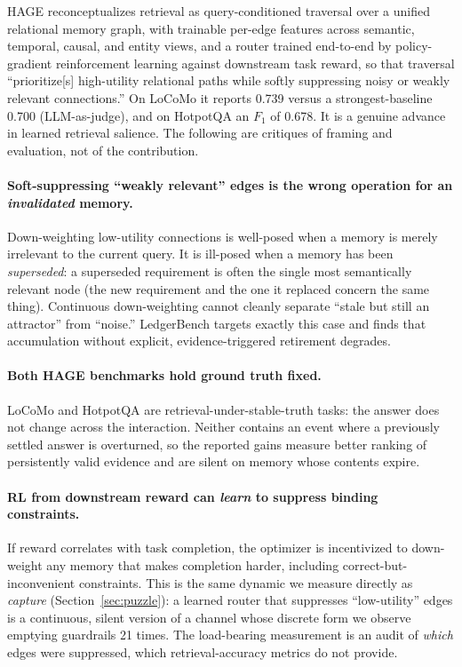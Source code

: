 \documentclass[11pt]{article}
\begin{document}
HAGE reconceptualizes retrieval as query-conditioned traversal over a unified
relational memory graph, with trainable per-edge features across semantic,
temporal, causal, and entity views, and a router trained end-to-end by
policy-gradient reinforcement learning against downstream task reward, so
that traversal ``prioritize[s] high-utility relational paths while softly
suppressing noisy or weakly relevant connections.'' On LoCoMo it reports
0.739 versus a strongest-baseline 0.700 (LLM-as-judge), and on HotpotQA an
$F_1$ of 0.678. It is a genuine advance in learned retrieval salience. The
following are critiques of framing and evaluation, not of the contribution.

\paragraph{Soft-suppressing ``weakly relevant'' edges is the wrong operation
for an \emph{invalidated} memory.} Down-weighting low-utility connections is
well-posed when a memory is merely irrelevant to the current query. It is
ill-posed when a memory has been \emph{superseded}: a superseded requirement
is often the single most semantically relevant node (the new requirement and
the one it replaced concern the same thing). Continuous down-weighting cannot
cleanly separate ``stale but still an attractor'' from ``noise.'' LedgerBench
targets exactly this case and finds that accumulation without explicit,
evidence-triggered retirement degrades.

\paragraph{Both HAGE benchmarks hold ground truth fixed.} LoCoMo and
HotpotQA are retrieval-under-stable-truth tasks: the answer does not change
across the interaction. Neither contains an event where a previously settled
answer is overturned, so the reported gains measure better ranking of
persistently valid evidence and are silent on memory whose contents expire.

\paragraph{RL from downstream reward can \emph{learn} to suppress binding
constraints.} If reward correlates with task completion, the optimizer is
incentivized to down-weight any memory that makes completion harder,
including correct-but-inconvenient constraints. This is the same dynamic we
measure directly as \emph{capture} (Section~\ref{sec:puzzle}): a learned
router that suppresses ``low-utility'' edges is a continuous, silent version
of a channel whose discrete form we observe emptying guardrails 21 times. The
load-bearing measurement is an audit of \emph{which} edges were suppressed,
which retrieval-accuracy metrics do not provide.
\end{document}
